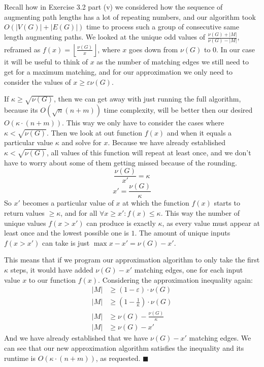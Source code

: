 \documentclass{article}
\let\epsilon\varepsilon
\begin{document}
  Recall how in Exercise 3.2 part (v) we considered how the sequence of augmenting path lengths has a lot of repeating numbers,
  and our algorithm took $O(|V (G)| + |E(G)|)$ time to process such a group of consecutive same length augmenting paths.
  We looked at the unique odd values of $\frac{\nu(G)+|M|}{\nu(G)-|M|}$, reframed as $f(x) = \left\lfloor\frac{\nu(G)}{x}\right\rfloor$, where $x$ goes down from $\nu(G)$ to $0$.
  In our case it will be useful to think of $x$ as the number of matching edges we still need to get for a maximum matching, and for our approximation we only need to consider the values of $x \geq \epsilon\nu(G)$.

  If $\kappa \geq \sqrt{\nu(G)}$, then we can get away with just running the full algorithm, because its $O(\sqrt{n}(n+m))$ time complexity, will be better then our desired $O(\kappa \cdot (n+m))$.
  This way we only have to consider the cases where $\kappa < \sqrt{\nu(G)}$.
  Then we look at out function $f(x)$ and when it equals a particular value $\kappa$ and solve for $x$.
  Because we have already established $\kappa < \sqrt{\nu(G)}$, all values of this function will repeat at least once,
  and we don't have to worry about some of them getting missed because of the rounding.
  \[ \frac{\nu(G)}{x'} = \kappa \]
  \[ x' = \frac{\nu(G)}{\kappa} \]
  So $x'$ becomes a particular value of $x$ at which the function $f(x)$ starts to return values $\geq \kappa$,
  and for all $\forall x \geq x' : f(x) \leq \kappa$.
  This way the number of unique values $f(x > x')$ can produce is exactly $\kappa$,
  as every value must appear at least once and the lowest possible one is $1$.
  The amount of unique inputs $f(x > x')$ can take is just $\max x - x' = \nu(G) - x'$.

  This means that if we program our approximation algorithm to only take the first $\kappa$ steps,
  it would have added $\nu(G) - x'$ matching edges, one for each input value $x$ to our function $f(x)$.
  Considering the approximation inequality again:
  \begin{align*}
    |M| &\geq (1 - \epsilon) \cdot \nu(G) \\
    |M| &\geq (1 - \frac{1}{\kappa}) \cdot \nu(G) \\
    |M| &\geq \nu(G) - \frac{\nu(G)}{\kappa} \\
    |M| &\geq \nu(G) - x'
  \end{align*}
  And we have already established that we have $\nu(G) - x'$ matching edges.
  We can see that our new approximation algorithm satisfies the inequality and its runtime is $O(\kappa \cdot (n+m))$, as requested.
  $\blacksquare$
\end{document}
